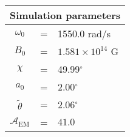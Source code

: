  \begin{tabular}{ccl}
\multicolumn{3}{c}{Simulation parameters} \\
\hline
$\omega_0$  &=& 1550.0 rad/s\\
$B_0$  &=& $ 1.581\times 10^{14} $ G \\
$\chi$  &=& 49.99$^{\circ}$ \\
$a_0$ &=& 2.00$^{\circ}$ \\
$\tilde{\theta}$ &= & 2.06$^{\circ}$ \\
$\mathcal{A}_{\mathrm{EM}}$ &= & $41.0$
\end{tabular}
    